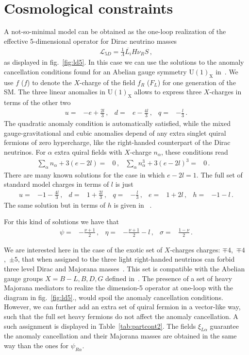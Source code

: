 \documentclass[12pt]{article}
\begin{document}
\section{Cosmological constraints}
\label{sec:CosmoConstraints}
A not-so-minimal model can be obtained as the one-loop realization of
the effective 5-dimensional operator for Dirac neutrino masses~\cite{Gu:2006dc}
\begin{align}
  \label{eq:ld5}
  \mathcal{L}_{5D}=\frac{1}{\Lambda} \overline{L_i} H \nu_R S\,,
\end{align}
as displayed in fig.~\ref{fig:ld5}.
In this case we can use the solutions to the anomaly cancellation conditions found for an Abelian gauge symmetry $\operatorname{U(1)_X}$ in~\cite{Campos:2017dgc,Okada:2018tgy}.
We use $f$ ($f$) to denote the $X$-charge of the field $f_R$ ($F_L$) for one generation of the SM. The three linear anomalies in $\operatorname{U(1)_X}$ allows to express three $X$-charges in terms of the other two
\begin{align}
  u=&-e+\frac{2l}{3}\,,& d=& e-\frac{4l}{3}\,,& q=& -\frac{l}{3}\,.
\end{align}
The quadratic anomaly condition is automatically satisfied, while the mixed gauge-gravitational and cubic anomalies depend of any extra singlet quiral fermions of zero hypercharge, like the right-handed counterpart of the Dirac neutrinos. For $\alpha$ extra quiral fields with $X$-charge $n_{\alpha}$, these conditions read
\begin{align}
  \sum_{\alpha} n_{\alpha}+3 (e-2l)=&0\,, &   \sum_{\alpha} n_{\alpha}^3+3 (e-2l)^3=&0\,. &
\end{align}
There are many known solutions for the case in which $e-2l=1$. The full set of standard model charges in terms of $l$ is just
\begin{align}
  u=&-1-\frac{4l}{3}\,,&d=&1+\frac{2l}{3}\,,&q=&-\frac{l}{3}\,,&e=&1+2l\,,&h=&-1-l\,.
\end{align}
The same solution but in terms of $h$ is given in ~\cite{Okada:2018tgy}.


For this kind of solutions we have that
\begin{align}
  \psi=&-\frac{\nu+1}{2}\,,&\eta=&-\frac{\nu+1}{2}-l\,,&\sigma=&\frac{1-\nu}{2}\,.
\end{align}



We are interested here in the case of the exotic set of $X$-charges
charges: $\mp 4$,~$\mp 4$,~$\pm 5$, that when assigned to the
three light right-handed neutrinos can forbid three level Dirac and
Majorana masses~\cite{Calle:2018ovc}. This set is compatible with the
Abelian gauge groups $X=B-L,B,D,G$ defined in~\cite{Campos:2017dgc}.
The presence of a set of heavy Majorana mediators to realize the
dimension-5 operator at one-loop with the diagram in
fig.~\ref{fig:ld5}., would spoil the anomaly cancellation conditions.
However, we can further add an extra set of quiral fermion in a
vector-like way, such that the full set heavy fermions do not affect
the anomaly cancellation. A such assignment is displayed in
Table~\ref{tab:partcont2}.
The fields $\xi_{L \alpha}$ guarantee the anomaly cancellation and
their Majorana masses are obtained in the same way than the ones for
$\psi_{R\alpha}$.
\end{document}
